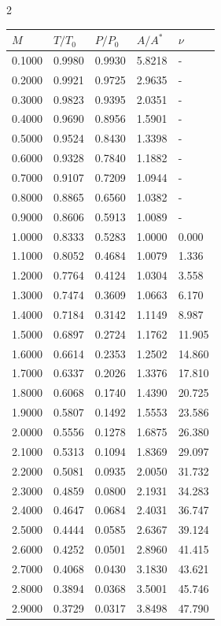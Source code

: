 
 \begin{multicols}{2}
 \begin{tabular}{|l|l|l|l|l|}
 \hline
 $M$ & $T/T_0$ & $P/P_0$ & $A/A^*$ & $\nu$ \\\hline
0.1000&0.9980&0.9930& 5.8218&-\\\hline
0.2000&0.9921&0.9725& 2.9635&-\\\hline
0.3000&0.9823&0.9395& 2.0351&-\\\hline
0.4000&0.9690&0.8956& 1.5901&-\\\hline
0.5000&0.9524&0.8430& 1.3398&-\\\hline
0.6000&0.9328&0.7840& 1.1882&-\\\hline
0.7000&0.9107&0.7209& 1.0944&-\\\hline
0.8000&0.8865&0.6560& 1.0382&-\\\hline
0.9000&0.8606&0.5913& 1.0089&-\\\hline
1.0000&0.8333&0.5283& 1.0000& 0.000\\\hline
1.1000&0.8052&0.4684& 1.0079& 1.336\\\hline
1.2000&0.7764&0.4124& 1.0304& 3.558\\\hline
1.3000&0.7474&0.3609& 1.0663& 6.170\\\hline
1.4000&0.7184&0.3142& 1.1149& 8.987\\\hline
1.5000&0.6897&0.2724& 1.1762&11.905\\\hline
1.6000&0.6614&0.2353& 1.2502&14.860\\\hline
1.7000&0.6337&0.2026& 1.3376&17.810\\\hline
1.8000&0.6068&0.1740& 1.4390&20.725\\\hline
1.9000&0.5807&0.1492& 1.5553&23.586\\\hline
2.0000&0.5556&0.1278& 1.6875&26.380\\\hline
2.1000&0.5313&0.1094& 1.8369&29.097\\\hline
2.2000&0.5081&0.0935& 2.0050&31.732\\\hline
2.3000&0.4859&0.0800& 2.1931&34.283\\\hline
2.4000&0.4647&0.0684& 2.4031&36.747\\\hline
2.5000&0.4444&0.0585& 2.6367&39.124\\\hline
2.6000&0.4252&0.0501& 2.8960&41.415\\\hline
2.7000&0.4068&0.0430& 3.1830&43.621\\\hline
2.8000&0.3894&0.0368& 3.5001&45.746\\\hline
2.9000&0.3729&0.0317& 3.8498&47.790\\\hline

\end{tabular}
\end{multicols}

